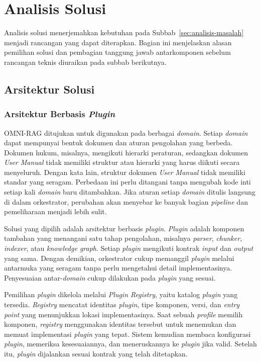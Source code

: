 \endgroup

\section{Analisis Solusi}
\label{sec:analisis-solusi}

Analisis solusi menerjemahkan kebutuhan pada Subbab~\ref{sec:analisis-masalah} menjadi rancangan yang dapat diterapkan. Bagian ini menjelaskan alasan pemilihan solusi dan pembagian tanggung jawab antarkomponen sebelum rancangan teknis diuraikan pada subbab berikutnya.

\subsection{Arsitektur Solusi}
\label{subsec:arsitektur-solusi}

\subsubsection{Arsitektur Berbasis \emph{Plugin}}
\label{subsubsec:arsitektur-berbasis-plugin}
OMNI-RAG ditujukan untuk digunakan pada berbagai \emph{domain}. Setiap \emph{domain} dapat mempunyai bentuk dokumen dan aturan pengolahan yang berbeda. Dokumen hukum, misalnya, mengikuti hierarki peraturan, sedangkan dokumen \emph{User Manual} tidak memiliki struktur atau hierarki yang harus diikuti secara menyeluruh. Dengan kata lain, struktur dokumen \emph{User Manual} tidak memiliki standar yang seragam. Perbedaan ini perlu ditangani tanpa mengubah kode inti setiap kali \emph{domain} baru ditambahkan. Jika aturan setiap \emph{domain} ditulis langsung di dalam orkestrator, perubahan akan menyebar ke banyak bagian \emph{pipeline} dan pemeliharaan menjadi lebih sulit.

Solusi yang dipilih adalah arsitektur berbasis \emph{plugin}. \emph{Plugin} adalah komponen tambahan yang menangani satu tahap pengolahan, misalnya \emph{parser}, \emph{chunker}, \emph{indexer}, atau \emph{knowledge graph}. Setiap \emph{plugin} mengikuti kontrak \emph{input} dan \emph{output} yang sama. Dengan demikian, orkestrator cukup memanggil \emph{plugin} melalui antarmuka yang seragam tanpa perlu mengetahui detail implementasinya. Penyesuaian antar-\emph{domain} cukup dilakukan pada \emph{plugin} yang sesuai.

Pemilihan \emph{plugin} dikelola melalui \emph{Plugin Registry}, yaitu katalog \emph{plugin} yang tersedia. \emph{Registry} mencatat identitas \emph{plugin}, tipe komponen, versi, dan \emph{entry point} yang menunjukkan lokasi implementasinya. Saat sebuah \emph{profile} memilih komponen, \emph{registry} menggunakan identitas tersebut untuk menemukan dan memuat implementasi \emph{plugin} yang tepat. Sistem kemudian membaca konfigurasi \emph{plugin}, memeriksa kesesuaiannya, dan meneruskannya ke \emph{plugin} jika valid. Setelah itu, \emph{plugin} dijalankan sesuai kontrak yang telah ditetapkan.

